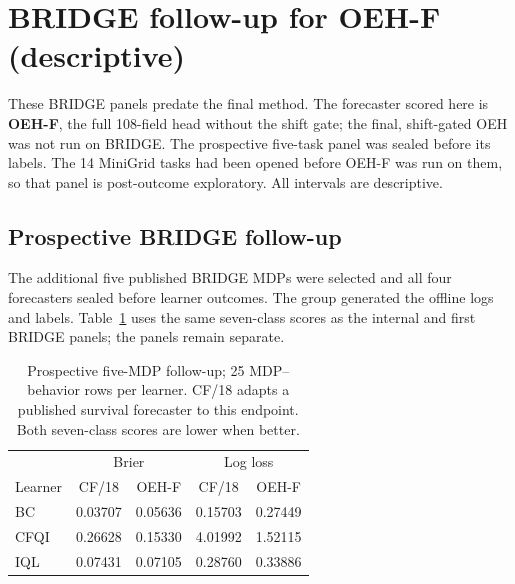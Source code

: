 \section{BRIDGE follow-up for OEH-F (descriptive)}\label{sec:bridge-oehf}
These BRIDGE panels predate the final method. The forecaster scored here is \textbf{OEH-F}, the full 108-field head without the shift gate; the final, shift-gated OEH was not run on BRIDGE. The prospective five-task panel was sealed before its labels. The 14 MiniGrid tasks had been opened before OEH-F was run on them, so that panel is post-outcome exploratory. All intervals are descriptive.
\subsection{Prospective BRIDGE follow-up}

The additional five published BRIDGE MDPs were selected and all four forecasters sealed before learner outcomes. The group generated the offline logs and labels. Table~\ref{tab:bridge-followup} uses the same seven-class scores as the internal and first BRIDGE panels; the panels remain separate.

\begin{table}[t]

\centering\small

\caption{Prospective five-MDP follow-up; 25 MDP--behavior rows per learner. CF/18 adapts a published survival forecaster to this endpoint. Both seven-class scores are lower when better.}

\label{tab:bridge-followup}

\begin{tabular}{lcccc}

\toprule

& \multicolumn{2}{c}{Brier} & \multicolumn{2}{c}{Log loss}\\

Learner & CF/18 & OEH-F & CF/18 & OEH-F\\

\midrule

BC & 0.03707 & 0.05636 & 0.15703 & 0.27449\\

CFQI & 0.26628 & 0.15330 & 4.01992 & 1.52115\\

IQL & 0.07431 & 0.07105 & 0.28760 & 0.33886\\

\bottomrule

\end{tabular}

\end{table}

